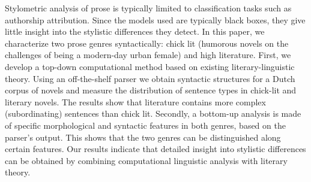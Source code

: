 Stylometric analysis of prose is typically limited to classification tasks such as authorship
 attribution. Since the models used are typically
 black boxes, they give little insight into
 the stylistic differences they detect. In this
 paper, we characterize two prose genres syntactically:
 chick lit (humorous novels on the
 challenges of being a modern-day urban female)
 and high literature. First, we develop
 a top-down computational method based on
 existing literary-linguistic theory. Using an
 off-the-shelf parser we obtain syntactic structures
 for a Dutch corpus of novels and measure
 the distribution of sentence types in chick-lit
 and literary novels. The results show that literature
 contains more complex (subordinating)
 sentences than chick lit. Secondly, a bottom-up
 analysis is made of specific morphological and
 syntactic features in both genres, based on the
 parser's output. This shows that the two genres
 can be distinguished along certain features.
 Our results indicate that detailed insight into
 stylistic differences can be obtained by combining
 computational linguistic analysis with
 literary theory.

